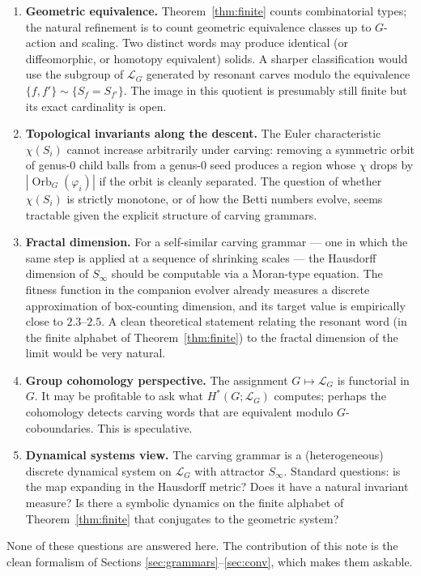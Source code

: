 \documentclass[11pt]{article}
\theoremstyle{definition}
\DeclareMathOperator{\Orb}{Orb}
\begin{document}
\begin{enumerate}
\item \textbf{Geometric equivalence.} Theorem~\ref{thm:finite} counts
  combinatorial types; the natural refinement is to count geometric
  equivalence classes up to $G$-action and scaling. Two distinct words
  may produce identical (or diffeomorphic, or homotopy equivalent)
  solids. A sharper classification would use the subgroup of
  $\mathcal{L}_G$ generated by resonant carves modulo the equivalence
  $\{f, f'\} \sim \{S_f = S_{f'}\}$. The image in this quotient is
  presumably still finite but its exact cardinality is open.

\item \textbf{Topological invariants along the descent.} The Euler
  characteristic $\chi(S_i)$ cannot increase arbitrarily under carving:
  removing a symmetric orbit of genus-$0$ child balls from a
  genus-$0$ seed produces a region whose $\chi$ drops by $|\Orb_G
  (\varphi_i)|$ if the orbit is cleanly separated. The question of
  whether $\chi(S_i)$ is strictly monotone, or of how the Betti
  numbers evolve, seems tractable given the explicit structure of
  carving grammars.

\item \textbf{Fractal dimension.} For a self-similar carving grammar
  --- one in which the same step is applied at a sequence of shrinking
  scales --- the Hausdorff dimension of $S_\infty$ should be computable
  via a Moran-type equation. The fitness function in the companion
  evolver already measures a discrete approximation of
  box-counting dimension, and its target value is empirically close
  to $2.3$--$2.5$. A clean theoretical statement relating the
  resonant word (in the finite alphabet of Theorem~\ref{thm:finite})
  to the fractal dimension of the limit would be very natural.

\item \textbf{Group cohomology perspective.} The assignment
  $G \mapsto \mathcal{L}_G$ is functorial in $G$. It may be profitable
  to ask what $H^*(G; \mathcal{L}_G)$ computes; perhaps the cohomology
  detects carving words that are equivalent modulo $G$-coboundaries.
  This is speculative.

\item \textbf{Dynamical systems view.} The carving grammar is a
  (heterogeneous) discrete dynamical system on $\mathcal{L}_G$ with
  attractor $S_\infty$. Standard questions: is the map expanding in
  the Hausdorff metric? Does it have a natural invariant measure?
  Is there a symbolic dynamics on the finite alphabet of
  Theorem~\ref{thm:finite} that conjugates to the geometric system?
\end{enumerate}

None of these questions are answered here. The contribution of this
note is the clean formalism of Sections \ref{sec:grammars}--\ref{sec:conv},
which makes them askable.
\end{document}
